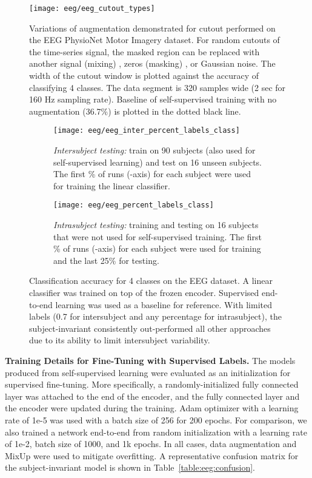 \documentclass{article}
\renewcommand{\paragraph}[1]{\textbf{#1}\hspace{1em}}
\begin{document}
\begin{figure}[H]
  \centering
  \texttt{[image: eeg/eeg\_cutout\_types]}
  \caption{Variations of augmentation demonstrated for cutout performed on the
  EEG PhysioNet Motor Imagery dataset. For random cutouts of the time-series
  signal, the masked region can be replaced with another signal (mixing)
  \cite{yun_cutmix_2019}, zeros (masking) \cite{devries_improved_2017}, or
  Gaussian noise. The width of the cutout window is plotted against the accuracy
  of classifying 4 classes. The data segment is 320 samples wide (2 sec for 160
  Hz sampling rate). Baseline of self-supervised training with no augmentation
  (36.7\%) is plotted in the dotted black line. }
  \label{fig:eeg:aug:cutout}
\end{figure}

\begin{figure}[H]
  \centering
  \begin{subfigure}[t]{0.49\textwidth}
    \texttt{[image: eeg/eeg\_inter\_percent\_labels\_class]}
    \caption{\textit{Intersubject testing:} train on 90 subjects (also used for
    self-supervised learning) and test on 16 unseen subjects. The first \% of
    runs (-axis) for each subject were used for training the linear
    classifier.}
  \end{subfigure}
  \hfill
  \begin{subfigure}[t]{0.49\textwidth}
    \texttt{[image: eeg/eeg\_percent\_labels\_class]}
    \caption{\textit{Intrasubject testing:} training and testing on 16 subjects
    that were not used for self-supervised training. The first \% of runs
    (-axis) for each subject were used for training and the last 25\% for testing.}
  \end{subfigure}
  \caption{Classification accuracy for 4 classes on the EEG dataset. A linear
  classifier was trained on top of the frozen encoder. Supervised end-to-end
  learning was used as a baseline for reference. With limited labels (0.7 for
  intersubject and any percentage for intrasubject), the subject-invariant
  consistently out-performed all other approaches due to its ability to limit
  intersubject variability.}
  \label{fig:eeg:labels:supp}
\end{figure}

\paragraph{Training Details for Fine-Tuning with Supervised Labels.}
The models produced from self-supervised learning were evaluated as an
initialization for supervised fine-tuning. More specifically, a
randomly-initialized fully connected layer was attached to the end of the
encoder, and the fully connected layer and the encoder were updated during the
training. Adam optimizer with a learning rate of 1e-5 was used with a batch size
of 256 for 200 epochs. For comparison, we also trained a network end-to-end from
random initialization with a learning rate of 1e-2, batch size of 1000, and 1k
epochs. In all cases, data augmentation and MixUp \cite{zhang_mixup_2018} were
used to mitigate overfitting. A representative confusion matrix for the
subject-invariant model is shown in Table~\ref{table:eeg:confusion}.
\end{document}
